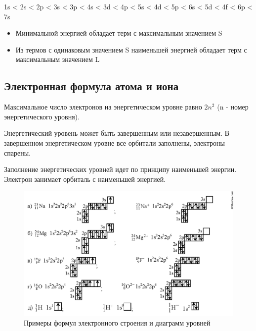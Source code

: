 1s < 2s < 2p < 3s < 3p < 4s < 3d < 4p < 5s < 4d < 5p < 6s < 5d < 4f < 6p < 7s

 
 \begin{itemize}
     \item Минимальной энергией обладает терм с максимальным значением S
     \item Из термов с одинаковым значением S наименьшей энергией обладает терм с максимальным значением L
 \end{itemize}
 
 \subsection{Электронная формула атома и иона}
 
 Максимальное число электронов на энергетическом уровне равно $2n^2$ (n - номер энергетического уровня).
 
 Энергетический уровень может быть завершенным или незавершенным. В завершенном энергетическом уровне все орбитали заполнены, электроны спарены.

Заполнение энергетических уровней идет по принципу наименьшей энергии. Электрон занимает орбиталь с наименьшей энергией.

\begin{figure}[H]
    \centering
    \includegraphics[width = \textwidth]{Pictures/6_atom.png}
    \caption{Примеры формул электронного строения и диаграмм уровней}
    \label{fig:7atom}
\end{figure}

